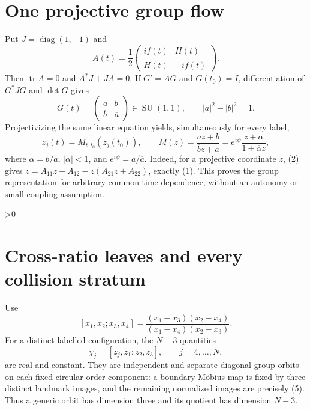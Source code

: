 \documentclass[8pt]{extarticle}
\newcommand{\SU}{\operatorname{SU}}
\begin{document}
\section{One projective group flow}
Put $J=\operatorname{diag}(1,-1)$ and
\begin{equation}
 A(t)=\frac12\begin{pmatrix}if(t)&H(t)\\
                    \overline{H(t)}&-if(t)\end{pmatrix}.       \tag{2}
\end{equation}
Then $\operatorname{tr}A=0$ and $A^*J+JA=0$.  If $G'=AG$ and
$G(t_0)=I$, differentiation of $G^*JG$ and $\det G$ gives
\begin{equation}
 G(t)=\begin{pmatrix}a&b\\\overline b&\overline a\end{pmatrix}
 \in\SU(1,1),\qquad |a|^2-|b|^2=1.                           \tag{3}
\end{equation}
Projectivizing the same linear equation yields, simultaneously for every
label,
\begin{equation}
 z_j(t)=M_{t,t_0}(z_j(t_0)),\qquad
 M(z)=\frac{az+b}{\overline b z+\overline a}
 =e^{i\psi}\frac{z+\alpha}{1+\overline\alpha z},             \tag{4}
\end{equation}
where $\alpha=b/a$, $|\alpha|<1$, and $e^{i\psi}=a/\overline a$.
Indeed, for a projective coordinate $z$, (2) gives
$\dot z=A_{11}z+A_{12}-z(A_{21}z+A_{22})$, exactly (1).  This proves the
group representation for arbitrary common time dependence, without an
autonomy or small-coupling assumption.

\ifnum\CRevisionRound>0
\section{Cross-ratio leaves and every collision stratum}
Use
\[
 [x_1,x_2;x_3,x_4]
 =\frac{(x_1-x_3)(x_2-x_4)}{(x_1-x_4)(x_2-x_3)}.
\]
For a distinct labelled configuration, the $N-3$ quantities
\begin{equation}
 \chi_j=[z_j,z_1;z_2,z_3],\qquad j=4,\ldots,N,                \tag{5}
\end{equation}
are real and constant.  They are independent and separate diagonal group
orbits on each fixed circular-order component: a boundary M\"obius map is
fixed by three distinct landmark images, and the remaining normalized images
are precisely (5).  Thus a generic orbit has dimension three and its quotient
has dimension $N-3$.
\end{document}
